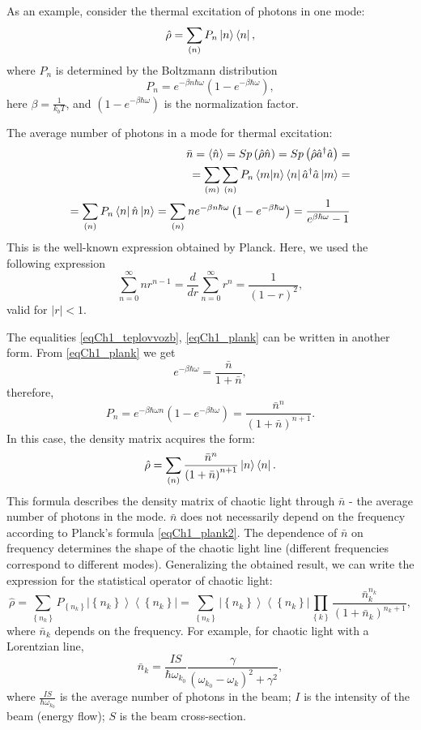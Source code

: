 As an example, consider the thermal excitation of photons in one mode:
\begin{equation}
\hat{\rho} = \sum_{(n)}
P_n\ket{n}\bra{n},
\label{eqCh1_teplovvozb}
\end{equation}
where $P_n$ is determined by the Boltzmann distribution
\[
P_n = e^{-\beta n \hbar \omega}\left(1  -  e^{-\beta \hbar \omega}\right),
\]
here $\beta = \frac{1}{k_b T}$, and $\left(1  -  e^{-\beta \hbar \omega}\right)$ is the normalization factor.

The average number of photons in a mode for thermal excitation:
\begin{eqnarray}
\bar{n} = \left<\hat{n}\right> =  Sp \left(\hat{\rho}\hat{n}\right) = 
Sp \left(\hat{\rho}\hat{a}^{\dag}\hat{a}\right) = 
\nonumber \\
=\sum_{(m)}\sum_{(n)}
P_n\bra{m}\ket{n}\bra{n}\hat{a}^{\dag}\hat{a}\ket{m}
= 
\nonumber \\
= \sum_{(n)}
P_n\bra{n}\hat{n}\ket{n} = \sum_{(n)} n
e^{-\beta n \hbar \omega}\left(1  -  e^{-\beta \hbar \omega}\right) = 
\frac{1}{e^{\beta \hbar \omega} - 1}
\label{eqCh1_plank}
\end{eqnarray}
This is the well-known expression obtained by Planck. Here, we used the following expression
\[
\sum_{n=0}^{\infty} n r^{n -1} = \frac{d}{d r} \sum_{n=0}^{\infty} r^{n} = \frac{1}{\left(1 - r\right)^2},
\]
valid for $\left|r\right| < 1$.

The equalities \eqref{eqCh1_teplovvozb}, \eqref{eqCh1_plank} can be written in another form. From \eqref{eqCh1_plank} we get 
\[
e^{-\beta \hbar \omega} = \frac{\bar{n}}{1 + \bar{n}},
\]
therefore, 
\begin{equation}
P_n = e^{-\beta \hbar \omega n} \left(1  -  e^{-\beta \hbar \omega}\right) = \frac{\bar{n}^n}{\left(1 + \bar{n}\right)^{n+1}}.
\label{eqCh1_plank2}
\end{equation}
In this case, the density matrix acquires the form:
\[
\hat{\rho} = \sum_{(n)}\frac{\bar{n}^n}{\left(1 + \bar{n}\right)^{n+1}}\ket{n}\bra{n}.
\]
This formula describes the density matrix of chaotic light through $\bar{n}$ - the average number of photons in the mode. $\bar{n}$ does not necessarily depend on the frequency according to Planck’s formula \eqref{eqCh1_plank2}. The dependence of $\bar{n}$ on frequency determines the shape of the chaotic light line (different frequencies correspond to different modes). Generalizing the obtained result, we can write the expression for the statistical operator of chaotic light:  
\begin{equation}
\hat{\rho} = \sum_{\left\{n_k\right\}} P_{\left\{n_k\right\}} \left|\left\{n_k\right\}\right>\left<\left\{n_k\right\}\right| = 
\sum_{\left\{n_k\right\}} 
 \left|\left\{n_k\right\}\right>\left<\left\{n_k\right\}\right|
\prod_{\left\{k\right\}} 
\frac{\bar{n}_k^{n_k}}{\left(1 + \bar{n}_k\right)^{n_k+1}},
\label{eqCh1_102}
\end{equation}
where $\bar{n}_k$ depends on the frequency. For example, for chaotic light with a Lorentzian line, 
\[
\bar{n}_k = \frac{I S}{\hbar \omega_{k_0}}
\frac{\gamma}{\left(\omega_{k_0} - \omega_{k}\right)^2 + \gamma^2},
\]
where $\frac{I S}{\hbar \omega_{k_0}}$ is the average number of photons in the beam; $I$ is the intensity of the beam (energy flow); $S$ is the beam cross-section.  
